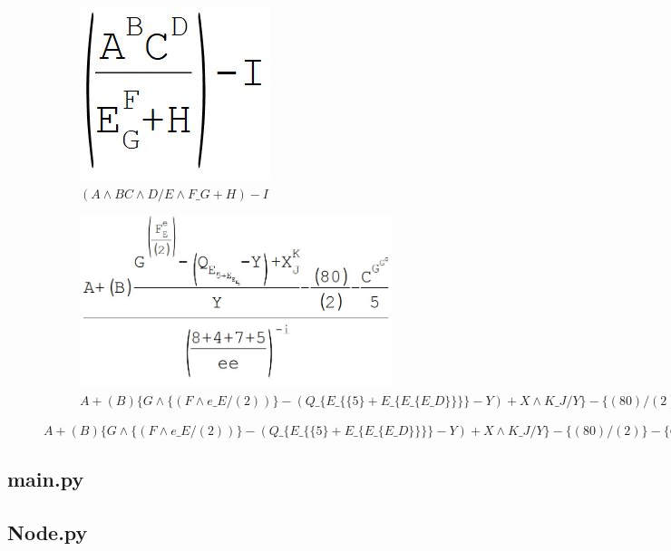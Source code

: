 \begin{figure}[htbp]
	\quad
	\begin{subfigure}[b]{0.3\textwidth}
	  \includegraphics[width=\textwidth]{imgs/test3}
	  \caption{$(A \wedge BC \wedge D/E \wedge F \_ G+H)-I$}
	\end{subfigure}
	
	\hfill
	
	\hfill
	
	\hfill
	
	\begin{subfigure}[b]{\textwidth}
	  \includegraphics[width=\textwidth]{imgs/test4}
	  \caption{$A+(B)\{G \wedge \{(F \wedge e \_ E/(2))\}-(Q \_ \{E \_ \{\{5\}+E \_ \{E \_ \{E \_ D\}\}\}\}-Y)+X \wedge K \_ J/Y\}-\{(80)/(2)\}-\{C \wedge \{G \wedge \{G \wedge \{G\}\}\}/5\}/(\{8+4+7\}+5/ee) \wedge \{-i\}$}
	\end{subfigure}
\end{figure}

\newpage
\subsection{main.py}


\newpage
\subsection{Node.py}
